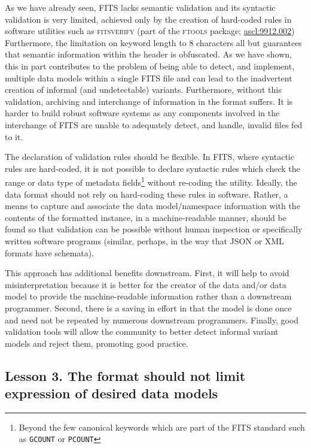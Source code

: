\documentclass[final,authoryear,5p,times,twocolumn]{elsarticle}
\begin{document}
{{As we have already seen, FITS lacks semantic validation and its
syntactic validation is very limited, achieved only by the creation
of hard-coded rules in software utilities such as \textsc{fitsverify}
(part of the \textsc{ftools} package; \href{http://ascl.net/9912.002}{ascl:9912.002})
Furthermore, the limitation on
keyword length to 8 characters all but guarantees that semantic
information within the header is obfuscated. As we have shown,
this in part contributes to the problem of being able to detect,
and implement, multiple data models within a single FITS file
and can lead to the inadvertent creation of informal (and
undetectable) variants. Furthermore, without this validation,
archiving and interchange of information in the format suffers.
It is harder to build robust software systems as any components
involved in the interchange of FITS are unable to adequately
detect, and handle, invalid files fed to it.

The declaration of validation rules should be flexible. In FITS,
where syntactic rules are hard-coded, it is not possible to
declare syntactic rules which check the range or data type of
metadata fields\footnote{Beyond the few canonical keywords
which are part of the FITS standard such as \texttt{GCOUNT}
or \texttt{PCOUNT}} without re-coding the utility.
Ideally, the data format should not rely on hard-coding these rules
in software. Rather, a means to capture and associate the data
model/namespace information with the contents of the formatted
instance, in a machine-readable manner, should be found so that
validation can be possible without human inspection or specifically
written software programs (similar, perhaps, in the way that JSON
or XML formats have schemata).


This approach has additional benefits downstream. First, it will help
to avoid misinterpretation because it is better for the creator
of the data and/or data model to provide the machine-readable information rather
than a downstream programmer. Second, there is a saving in effort
in that the model is done once and need not be repeated by numerous
downstream programmers. Finally, good validation tools will allow the community
to better detect informal variant models and reject them, promoting good
practice.


\subsection{Lesson 3. The format should not limit expression of desired data models}

}}
\end{document}
